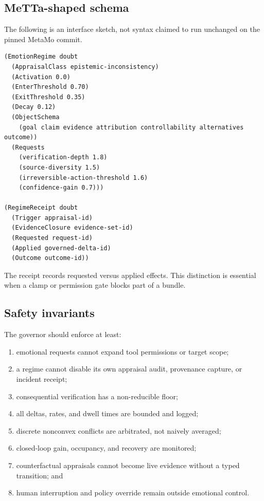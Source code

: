 \documentclass[11pt]{article}
\begin{document}
\subsection{MeTTa-shaped schema}

The following is an interface sketch, not syntax claimed to run unchanged on
the pinned MetaMo commit.

\begin{lstlisting}
(EmotionRegime doubt
  (AppraisalClass epistemic-inconsistency)
  (Activation 0.0)
  (EnterThreshold 0.70)
  (ExitThreshold 0.35)
  (Decay 0.12)
  (ObjectSchema
    (goal claim evidence attribution controllability alternatives outcome))
  (Requests
    (verification-depth 1.8)
    (source-diversity 1.5)
    (irreversible-action-threshold 1.6)
    (confidence-gain 0.7)))

(RegimeReceipt doubt
  (Trigger appraisal-id)
  (EvidenceClosure evidence-set-id)
  (Requested request-id)
  (Applied governed-delta-id)
  (Outcome outcome-id))
\end{lstlisting}

The receipt records requested versus applied effects.  This distinction is
essential when a clamp or permission gate blocks part of a bundle.

\subsection{Safety invariants}

The governor should enforce at least:
\begin{enumerate}[leftmargin=*]
  \item emotional requests cannot expand tool permissions or target scope;
  \item a regime cannot disable its own appraisal audit, provenance capture, or
  incident receipt;
  \item consequential verification has a non-reducible floor;
  \item all deltas, rates, and dwell times are bounded and logged;
  \item discrete nonconvex conflicts are arbitrated, not naively averaged;
  \item closed-loop gain, occupancy, and recovery are monitored;
  \item counterfactual appraisals cannot become live evidence without a typed
  transition; and
  \item human interruption and policy override remain outside emotional control.
\end{enumerate}
\end{document}

